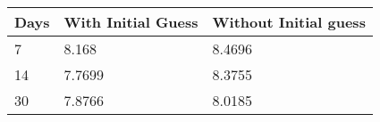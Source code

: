 \begin{tabular}{lll}
Days & With Initial Guess & Without Initial guess \\ 
\hline 
7 & 8.168 & 8.4696 \\ 
14 & 7.7699 & 8.3755 \\ 
30 & 7.8766 & 8.0185 \\ 
\hline 
\end{tabular}